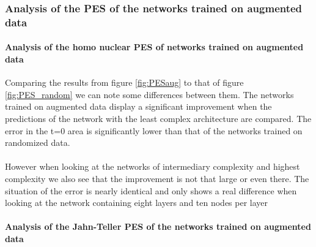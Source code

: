\documentclass[12pt]{article}
\begin{document}
\newpage
\subsubsection{Analysis of the PES of the networks trained on augmented data}

\paragraph{Analysis of the homo nuclear PES of networks trained on augmented data}

Comparing the results from figure \ref{fig:PESaug} to that of figure \ref{fig:PES_random} we can note some differences between them. The networks trained on augmented data display a significant improvement when the predictions of the network with the least complex architecture are compared. The error in the t=0 area is significantly lower than that of the networks trained on randomized data.
\\
\\
However when looking at the networks of intermediary complexity and highest complexity we also see that the improvement is not that large or even there. The situation of the error is nearly identical and only shows a real difference when looking at the network containing eight layers and ten nodes per layer
\paragraph{Analysis of the Jahn-Teller PES of the networks trained on augmented data}
\end{document}
